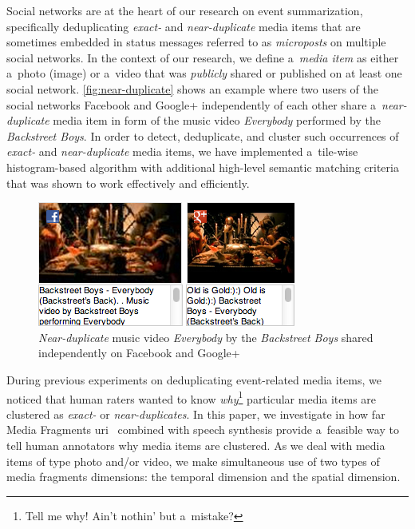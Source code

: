 \documentclass{article}
\begin{document}
Social networks are at the heart of our research on event summarization, specifically deduplicating \emph{exact-} and \emph{near-duplicate} media items that are sometimes embedded in status messages referred to as \emph{microposts} on multiple social networks. In the context of our research, we define a~\emph{media item} as either a~photo (image) or a~video that was \emph{publicly} shared or published on at least one social network. \autoref{fig:near-duplicate} shows an example where two users of the social networks Facebook and Google+ independently of each other share a~\emph{near-duplicate} media item in form of the music video \emph{Everybody} performed by the \emph{Backstreet Boys}. In order to detect, deduplicate, and cluster such occurrences of \emph{exact-} and \emph{near-duplicate} media items, we have implemented a~tile-wise histogram-based algorithm with additional high-level semantic matching criteria that was shown to work effectively and efficiently.

\begin{figure}[b!]
  \centering
  \includegraphics[width=0.9\linewidth]{./backstreetboys.png}
  \caption{\emph{Near-duplicate} music video \emph{Everybody} by the \emph{Backstreet Boys} shared independently on Facebook and Google+}
  \label{fig:near-duplicate}
\end{figure}

During previous experiments on deduplicating event-related media items, we noticed that human raters wanted to know \emph{why}\footnote{Tell me why! Ain't nothin' but a~mistake?} particular media items are clustered as \emph{exact-} or \emph{near-duplicates}. In this paper, we investigate in how far
Media Fragments {\sc uri}~\cite{troncy2012mediafragments} combined with speech synthesis provide a~feasible way to tell human annotators why media items are clustered. As we deal with media items of type photo and/or video, we make simultaneous use of two types of media fragments dimensions: the temporal dimension and the spatial dimension.
\end{document}
